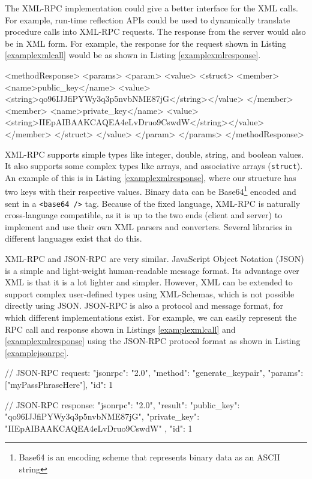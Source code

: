 The XML-RPC implementation could give a better interface for the XML calls. For example, run-time reflection APIs could be used to dynamically translate procedure calls into XML-RPC requests. The response from the server would also be in XML form. For example, the response for the request shown in Listing \ref{examplexmlcall} would be as shown in Listing \ref{examplexmlresponse}.

\begin{code}
<methodResponse>
  <params>
    <param>
        <value>
          <struct>
            <member>
              <name>public_key</name>
              <value><string>qo96IJJfiPYWy3q3p5nvbNME87jG</string></value>
            </member>
            <member>
              <name>private_key</name>
              <value><string>IIEpAIBAAKCAQEA4eLvDruo9CswdW</string></value>
            </member>
          </struct>
        </value>
    </param>
  </params>
</methodResponse>
\end{code}

XML-RPC supports simple types like integer, double, string, and boolean values. It also supports some complex types like arrays, and associative arrays (\lstinline{struct}). An example of this is in Listing \ref{examplexmlresponse}, where our structure has two keys with their respective values. Binary data can be Base64\footnote{Base64 is an encoding scheme that represents binary data as an ASCII string} encoded and sent in a \lstinline{<base64 />} tag. Because of the fixed language, XML-RPC is naturally cross-language compatible, as it is up to the two ends (client and server) to implement and use their own XML parsers and converters. Several libraries in different languages exist that do this.

XML-RPC and JSON-RPC are very similar. JavaScript Object Notation (JSON) is a simple and light-weight human-readable message format. Its advantage over XML is that it is a lot lighter and simpler. However, XML can be extended to support complex user-defined types using XML-Schemas, which is not possible directly using JSON. JSON-RPC is also a protocol and message format, for which different implementations exist. For example, we can easily represent the RPC call and response shown in Listings \ref{examplexmlcall} and \ref{examplexmlresponse} using the JSON-RPC protocol format as shown in Listing \ref{examplejsonrpc}.
\\

\begin{code}
// JSON-RPC request:
{ 
  "jsonrpc": "2.0", 
  "method": "generate_keypair", 
  "params": ["myPassPhraseHere"], 
  "id": 1
}


// JSON-RPC response:
{
  "jsonrpc": "2.0", 
  "result": {
    "public_key": "qo96IJJfiPYWy3q3p5nvbNME87jG",
    "private_key": "IIEpAIBAAKCAQEA4eLvDruo9CswdW"
  }, 
  "id": 1
}

\end{code}

